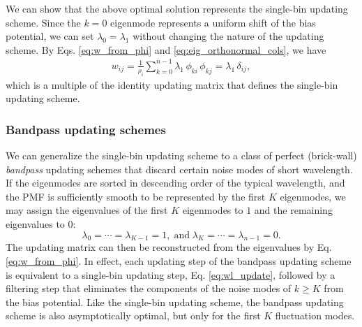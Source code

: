 \documentclass[reprint, superscriptaddress, floatfix]{revtex4-1}
\newcommand{\Err}{E}
\begin{document}
We can show that the above optimal solution
represents the single-bin updating scheme.
%
Since the $k = 0$ eigenmode represents
a uniform shift of the bias potential,
we can set $\lambda_0 = \lambda_1$
without changing the nature of the updating scheme.
%
By Eqs. \eqref{eq:w_from_phi} and
\eqref{eq:eig_orthonormal_cols}, we have
\begin{align*}
  w_{ij}
  = \frac{1}{\rho_i} \sum_{k=0}^{n-1} \lambda_1 \, \phi_{ki} \, \phi_{kj}
  = \lambda_1 \, \delta_{ij}
  ,
\end{align*}
which is a multiple of the identity updating matrix
that defines the single-bin updating scheme.
%
%
%
%
%




\subsubsection{\label{sec:bandpass}
Bandpass updating schemes}


We can generalize
the single-bin updating scheme to a class of
perfect (brick-wall) \emph{bandpass} updating schemes
that discard certain noise modes
of short wavelength.
%
If the eigenmodes are sorted in descending order
of the typical wavelength,
and the PMF is sufficiently smooth
to be represented by the first $K$
eigenmodes,
we may assign the eigenvalues of the first $K$ eigenmodes to $1$
and the remaining eigenvalues to $0$:
%
\begin{equation}
  \lambda_0 = \cdots = \lambda_{K-1} = 1
  ,
  \mathrm{\; and \;}
  \lambda_K = \cdots = \lambda_{n-1} = 0
  .
  \label{eq:lambda_bandpass}
\end{equation}
%
The updating matrix can then be reconstructed
from the eigenvalues by Eq. \eqref{eq:w_from_phi}.
%
%
In effect, each updating step of the bandpass updating scheme
is equivalent to a single-bin updating step,
Eq. \eqref{eq:wl_update},
followed by a filtering step
that eliminates the components of the noise modes of $k \ge K$
from the bias potential.
%
%
Like the single-bin updating scheme,
the bandpass updating scheme is also
asymptotically optimal,
but only for the first $K$ fluctuation modes.
\end{document}
